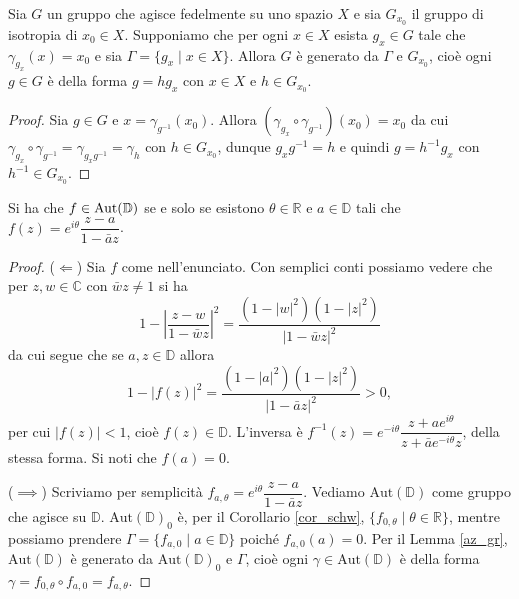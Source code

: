 \begin{lm} \label{az_gr}
  Sia $G$ un gruppo che agisce fedelmente su uno spazio $X$ e sia $G_{x_0}$ il gruppo di isotropia di $x_0 \in X$. Supponiamo che per ogni $x \in X$ esista $g_x \in G$ tale che $\gamma_{g_x}(x)=x_0$ e sia $\Gamma=\{g_x \mid x \in X\}$.
  Allora $G$ è generato da $\Gamma$ e $G_{x_0}$, cioè ogni $g \in G$ è della forma $g=hg_x$ con $x \in X$ e $h \in G_{x_0}$.
\end{lm}

\begin{proof}
  Sia $g \in G$ e $x=\gamma_{g^{-1}}(x_0)$. Allora $(\gamma_{g_x}\circ \gamma_{g^{-1}})(x_0)=x_0$ da cui $\gamma_{g_x}\circ \gamma_{g^{-1}}=\gamma_{g_xg^{-1}}=\gamma_h$ con $h \in G_{x_0}$,
  dunque $g_xg^{-1}=h$ e quindi $g=h^{-1}g_x$ con $h^{-1} \in G_{x_0}$.
\end{proof}

\begin{prop} \label{aut}
  Si ha che $f \in \text{\normalfont{Aut}}(\mathbb{D})$ se e solo se esistono $\theta \in \mathbb{R}$ e $a \in \mathbb{D}$ tali che $f(z)=e^{i\theta}\dfrac{z-a}{1-\bar{a}z}$.
\end{prop}

\begin{proof}
  ($\Leftarrow$) Sia $f$ come nell'enunciato. Con semplici conti possiamo vedere che per $z,w \in \mathbb{C}$ con $\bar{w}z\not=1$ si ha
  \begin{equation} \label{formuletta}
    1-\left|\frac{z-w}{1-\bar{w}z}\right|^2=\frac{(1-|w|^2)(1-|z|^2)}{|1-\bar{w}z|^2}
  \end{equation}
  da cui segue che se $a, z \in \mathbb{D}$ allora
  $$1-|f(z)|^2=\frac{(1-|a|^2)(1-|z|^2)}{|1-\bar{a}z|^2}>0,$$
  per cui $|f(z)|<1$, cioè $f(z) \in \mathbb{D}$. L'inversa è $f^{-1}(z)=e^{-i\theta}\dfrac{z+ae^{i\theta}}{z+\bar{a}e^{-i\theta}z}$, della stessa forma. Si noti che $f(a)=0$.

  ($\implies$) Scriviamo per semplicità $f_{a, \theta}=e^{i\theta}\dfrac{z-a}{1-\bar{a}z}$. Vediamo $\text{Aut}(\mathbb{D})$ come gruppo che agisce su $\mathbb{D}$. $\text{Aut}(\mathbb{D})_0$ è, per il Corollario \ref{cor_schw}, $\{f_{0, \theta} \mid \theta \in \mathbb{R}\}$,
  mentre possiamo prendere $\Gamma=\{f_{a, 0} \mid a \in \mathbb{D}\}$ poiché $f_{a, 0}(a)=0$.
  Per il Lemma \ref{az_gr}, $\text{Aut}(\mathbb{D})$ è generato da $\text{Aut}(\mathbb{D})_0$ e $\Gamma$, cioè ogni $\gamma \in \text{Aut}(\mathbb{D})$ è della forma $\gamma=f_{0, \theta} \circ f_{a, 0}=f_{a, \theta}$.
\end{proof}


